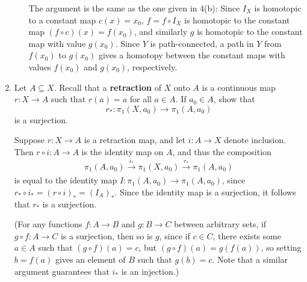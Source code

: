 \documentclass[letterpaper,12pt]{article}
\begin{document}
\begin{enumerate}
\begin{enumerate}
The argument is the same as the one given in 4(b): Since $I_X$ is homotopic to a constant map $c(x)=x_0$, $f=f\circ I_X$ is homotopic to the constant map $(f\circ c)(x) = f(x_0)$, and similarly $g$ is homotopic to the constant map with value $g(x_0)$. Since $Y$ is path-connected, a path in $Y$ from $f(x_0)$ to $g(x_0)$ gives a homotopy between the constant maps with values $f(x_0)$ and $g(x_0)$, respectively.

\bigskip

\end{enumerate}
\item Let $A\subseteq X$. Recall that a {\bf retraction} of $X$ onto $A$ is a continuous map $r:X\to A$ such that $r(a)=a$ for all $a\in A$. If $a_0\in A$, show that
\[
r_*:\pi_1(X,a_0)\to \pi_1(A,a_0)
\]
is a surjection.

\bigskip

Suppose $r:X\to A$ is a retraction map, and let $i:A\to X$ denote inclusion. Then $r\circ i:A\to A$ is the identity map on $A$, and thus the composition
\[
 \pi_1(A,a_0)\xrightarrow[]{i_*} \pi_1(X,a_0) \xrightarrow[]{r_*} \pi_1(A,a_0)
\]
is equal to the identity map $I:\pi_1(A,a_0)\to \pi_1(A,a_0)$, since $r_*\circ i_* = (r\circ i)_* = (I_A)_*$. Since the identity map is a surjection, it follows that $r_*$ is a surjection.

(For any functions $f:A\to B$ and $g:B\to C$ between arbitrary sets, if $g\circ f:A\to C$ is a surjection, then so is $g$, since if $c\in C$, there exists some $a\in A$ such that $(g\circ f)(a) = c$, but $(g\circ f)(a) = g(f(a))$, so setting $b=f(a)$ gives an element of $B$ such that $g(b)=c$. Note that a similar argument guarantees that $i_*$ is an injection.)
\end{enumerate}
\end{document}
